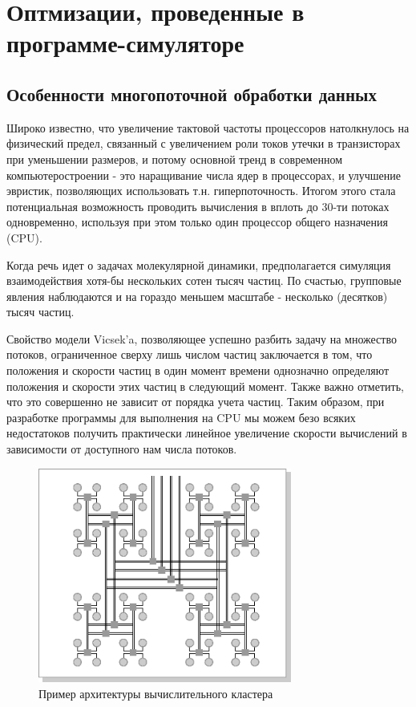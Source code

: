\section{Оптмизации, проведенные в программе-симуляторе} %
\label{sec:ProgrammOptimisations}

    \subsection{Особенности многопоточной обработки данных} %
    \label{sub:MultithreadMulticoreDataProcessing}
        Широко известно, что увеличение тактовой частоты процессоров натолкнулось на физический предел, связанный с увеличением роли токов утечки в транзисторах при уменьшении размеров, и потому основной тренд в современном компьютеростроении - это наращивание числа ядер в процессорах, и улучшение эвристик, позволяющих использовать т.н. гиперпоточность. Итогом этого стала потенциальная возможность проводить вычисления в вплоть до 30-ти потоках одновременно, используя при этом только один процессор общего назначения (CPU).

        Когда речь идет о задачах молекулярной динамики, предполагается симуляция взаимодействия хотя-бы нескольких сотен тысяч частиц. По счастью, групповые явления наблюдаются и на гораздо меньшем масштабе - несколько (десятков) тысяч частиц.

        Свойство модели Vicsek'a, позволяющее успешно разбить задачу на множество потоков, ограниченное сверху лишь числом частиц заключается в том, что положения и скорости частиц в один момент времени однозначно определяют положения и скорости этих частиц в следующий момент. Также важно отметить, что это совершенно не зависит от порядка учета частиц. Таким образом, при разработке программы для выполнения на CPU мы можем безо всяких недостатоков получить практически линейное увеличение скорости вычислений в зависимости от доступного нам числа потоков.

        \begin{figure}[h]
        \centering
            \includegraphics[height=200pt]{Images/KlusterArhitecture}
            \caption{Пример архитектуры вычислительного кластера}
            \label{fig:KlusterArchitecture}
        \end{figure}

